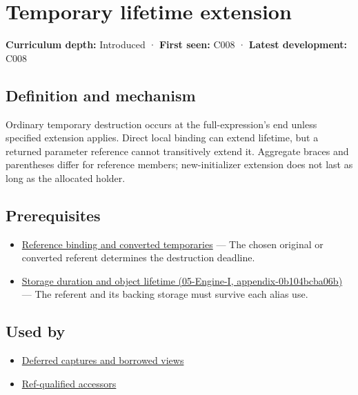 \hypertarget{appendix-a978b29bbbb0}{}
\section{Temporary lifetime extension}\label{appendix-a978b29bbbb0-temporary-lifetime-extension}

\textbf{Curriculum depth:} Introduced · \textbf{First seen:} C008 · \textbf{Latest development:} C008

\subsection{Definition and mechanism}\label{appendix-a978b29bbbb0-definition-and-mechanism}

Ordinary temporary destruction occurs at the full-expression's end unless specified extension applies. Direct local binding can extend lifetime, but a returned parameter reference cannot transitively extend it. Aggregate braces and parentheses differ for reference members; new-initializer extension does not last as long as the allocated holder.

\subsection{Prerequisites}\label{appendix-a978b29bbbb0-prerequisites}

\begin{itemize}
\tightlist
\item
  \hyperref[appendix-37856d997bb0]{Reference binding and converted temporaries} --- The chosen original or converted referent determines the destruction deadline.
\item
  \href{../05-Engine-I/main.pdf\#nameddest=appendix-0b104bcba06b}{Storage duration and object lifetime (05-Engine-I, appendix-0b104bcba06b)} --- The referent and its backing storage must survive each alias use.
\end{itemize}

\subsection{Used by}\label{appendix-a978b29bbbb0-used-by}

\begin{itemize}
\tightlist
\item
  \hyperref[appendix-aea529eb5175]{Deferred captures and borrowed views}
\item
  \hyperref[appendix-d42039b1d6f7]{Ref-qualified accessors}
\end{itemize}

